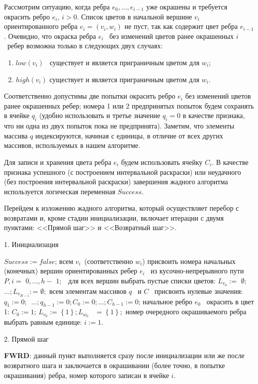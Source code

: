 Рассмотрим ситуацию, когда ребра  $e_0, \dots ,e_{i-1}$ уже окрашены и требуется окрасить ребро  $e_i$,  $i>0$. Список
цветов в начальной вершине  $v_i$ ориентированного ребра  $e_i=(v_i,w_i)$ не пуст, так как содержит цвет ребра
$e_{i-1}$. Очевидно, что окраска ребра  $e_i$ \ без изменений цветов ранее окрашенных  $i$ \ ребер возможна только в
следующих двух случаях:
\begin{enumerate}[1)]
  \item
  $\mathit{low}(v_i)$ \ существует и является приграничным цветом для  $w_i$;
  \item
  $\mathit{high}(v_i)$ существует и является приграничным цветом для  $w_i$.
\end{enumerate}
Соответственно допустимы две попытки
окрасить ребро  $e_i$ без изменений цветов ранее окрашенных ребер; номера 1 или 2 предпринятых попыток будем
сохранять в ячейке  $q_i$ (удобно использовать и третье значение  $q_i=0$ в качестве признака, что ни одна из двух
попыток пока не предпринята).
 Заметим, что элементы массива  $q$  индексируются, начиная с единицы, в отличие от всех
других массивов, используемых в нашем алгоритме.

Для записи и хранения цвета ребра  $e_i$  будем использовать ячейку  $C_i$. В качестве признака успешного (с
построением интервальной раскраски) или неудачного (без построения интервальной раскраски) завершения жадного алгоритма
используется логическая переменная  $\mathit{Success}$.

Перейдем к изложению жадного алгоритма, который осуществляет перебор с возвратами и, кроме стадии инициализации,
включает итерации с двумя пунктами: <<Прямой шаг>> и <<Возвратный шаг>>.

1. Инициализация

$\mathit{Success}:=\mathit{false}$; всем  $v_i$\ (соответственно  $w_i$) присвоить номера начальных (конечных) вершин
ориентированных ребер  $e_i$ \ из кусочно-непрерывного пути  $P,i=\text{~}0,\dots ,h-\text{~}1;$ \ для всех вершин
выбрать пустые списки цветов:  $L_{v_0}:=\text{~}{\emptyset};$\  $\dots ;L_{v_{H-1}}:$= ${\emptyset};$ всем элементам
массивов  $q$ \ и  $C$ \ присвоить нулевые значения:  $q_1:=0;$\  $\dots ;q_{h-1}:=0;C_0:=0;\dots ;C_{h-1}:=0$;
начальное ребро  $e_0$ \ окрасить в цвет 1:  $C_0:=1$;  $L_{v_0}:=\left\{1\right\};L_{w_0}$ \  $=\left\{1\right\};$
номер очередного окрашиваемого ребра выбрать равным единице:  $i:=1$.

2. Прямой шаг

\foreignlanguage{english}{\textbf{FWRD}}: данный пункт выполняется сразу после инициализации или же после возвратного
шага и заключается в окрашивании (более точно, в попытке окрашивания) ребра, номер которого записан в ячейке  $i$.

